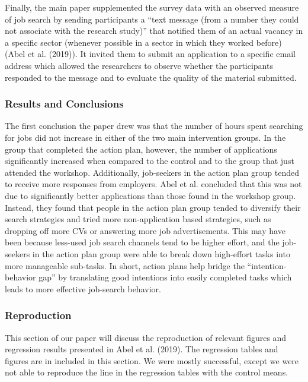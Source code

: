 \documentclass[]{elsarticle} %
\begin{document}
Finally, the main paper supplemented the survey data with an observed
measure of job search by sending participants a ``text message (from a
number they could not associate with the research study)'' that notified
them of an actual vacancy in a specific sector (whenever possible in a
sector in which they worked before) (Abel et al. (2019)). It invited
them to submit an application to a specific email address which allowed
the researchers to observe whether the participants responded to the
message and to evaluate the quality of the material submitted.

\subsubsection{Results and Conclusions}\label{results-and-conclusions}

The first conclusion the paper drew was that the number of hours spent
searching for jobs did not increase in either of the two main
intervention groups. In the group that completed the action plan,
however, the number of applications significantly increased when
compared to the control and to the group that just attended the
workshop. Additionally, job-seekers in the action plan group tended to
receive more responses from employers. Abel et al. concluded that this
was not due to significantly better applications than those found in the
workshop group. Instead, they found that people in the action plan group
tended to diversify their search strategies and tried more
non-application based strategies, such as dropping off more CVs or
answering more job advertisements. This may have been because less-used
job search channels tend to be higher effort, and the job-seekers in the
action plan group were able to break down high-effort tasks into more
manageable sub-tasks. In short, action plans help bridge the
``intention-behavior gap'' by translating good intentions into easily
completed tasks which leads to more effective job-search behavior.

\subsubsection{Reproduction}\label{reproduction}

This section of our paper will discuss the reproduction of relevant
figures and regression results presented in Abel et al. (2019). The
regression tables and figures are in included in this section. We were
mostly successful, except we were not able to reproduce the line in the
regression tables with the control means.
\end{document}
